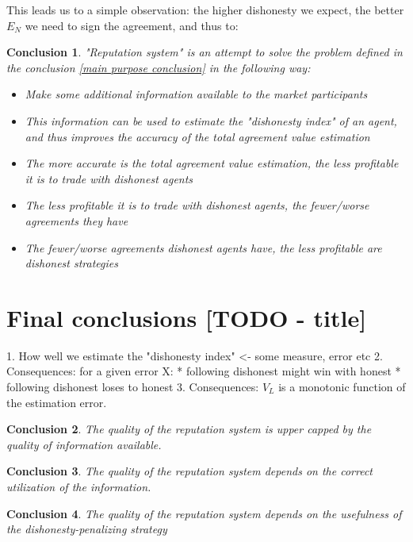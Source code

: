 \documentclass{article}
\newtheorem{conclusion}{Conclusion}[section]
\begin{document}
This leads us to a simple observation: the higher dishonesty we expect, the better $E_N$ we need to sign the agreement, and thus to:

\begin{conclusion}

"Reputation system" is an attempt to solve the problem defined in the conclusion \ref{main purpose conclusion} in the following way:

\begin{itemize}
    \item Make some additional information available to the market participants
    \item This information can be used to estimate the "dishonesty index" of an agent, and thus improves the accuracy of the total agreement value estimation
    \item The more accurate is the total agreement value estimation, the less profitable it is to trade with dishonest agents
    \item The less profitable it is to trade with dishonest agents, the fewer/worse agreements they have
    \item The fewer/worse agreements dishonest agents have, the less profitable are dishonest strategies
\end{itemize}

\end{conclusion}


\section{Final conclusions [TODO - title]}

1. How well we estimate the "dishonesty index" <- some measure, error etc
2. Consequences: for a given error X:
    *   following dishonest might win with honest
    *   following dishonest loses to honest
3. Consequences: $V_L$ is a monotonic function of the estimation error.

\begin{conclusion}
The quality of the reputation system is upper capped by the quality of information available.
\end{conclusion}

\begin{conclusion}
The quality of the reputation system depends on the correct utilization of the information.
\end{conclusion}

\begin{conclusion}
The quality of the reputation system depends on the usefulness of the dishonesty-penalizing strategy
\end{conclusion}
\end{document}
